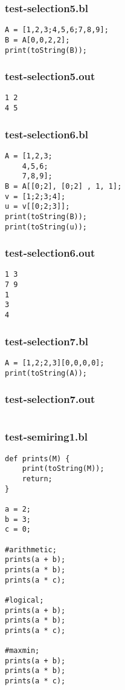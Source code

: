 \subsubsection{test-selection5.bl}
\begin{lstlisting}
A = [1,2,3;4,5,6;7,8,9];
B = A[0,0,2,2];
print(toString(B));\end{lstlisting}
\subsubsection{test-selection5.out}
\begin{lstlisting}
1 2
4 5\end{lstlisting}
\subsubsection{test-selection6.bl}
\begin{lstlisting}
A = [1,2,3;
    4,5,6;
    7,8,9];
B = A[[0;2], [0;2] , 1, 1];
v = [1;2;3;4];
u = v[[0;2;3]];
print(toString(B));
print(toString(u));\end{lstlisting}
\subsubsection{test-selection6.out}
\begin{lstlisting}
1 3
7 9
1
3
4\end{lstlisting}
\subsubsection{test-selection7.bl}
\begin{lstlisting}
A = [1,2;2,3][0,0,0,0];
print(toString(A));
\end{lstlisting}
\subsubsection{test-selection7.out}
\begin{lstlisting}
\end{lstlisting}
\subsubsection{test-semiring1.bl}
\begin{lstlisting}
def prints(M) {
    print(toString(M));
    return;
}

a = 2;
b = 3;
c = 0;

#arithmetic;
prints(a + b);
prints(a * b);
prints(a * c);

#logical;
prints(a + b);
prints(a * b);
prints(a * c);

#maxmin;
prints(a + b);
prints(a * b);
prints(a * c);
\end{lstlisting}
